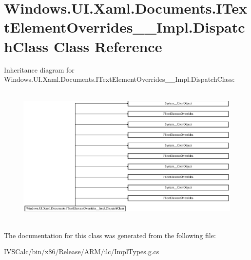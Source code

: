 \hypertarget{class_windows_1_1_u_i_1_1_xaml_1_1_documents_1_1_i_text_element_overrides_____impl_1_1_dispatch_class}{}\section{Windows.\+U\+I.\+Xaml.\+Documents.\+I\+Text\+Element\+Overrides\+\_\+\+\_\+\+Impl.\+Dispatch\+Class Class Reference}
\label{class_windows_1_1_u_i_1_1_xaml_1_1_documents_1_1_i_text_element_overrides_____impl_1_1_dispatch_class}
Inheritance diagram for Windows.\+U\+I.\+Xaml.\+Documents.\+I\+Text\+Element\+Overrides\+\_\+\+\_\+\+Impl.\+Dispatch\+Class\+:\begin{figure}[H]
\begin{center}
\leavevmode
\includegraphics[height=7.096774cm]{class_windows_1_1_u_i_1_1_xaml_1_1_documents_1_1_i_text_element_overrides_____impl_1_1_dispatch_class}
\end{center}
\end{figure}


The documentation for this class was generated from the following file\+:\begin{DoxyCompactItemize}
\item 
I\+V\+S\+Calc/bin/x86/\+Release/\+A\+R\+M/ilc/Impl\+Types.\+g.\+cs\end{DoxyCompactItemize}

